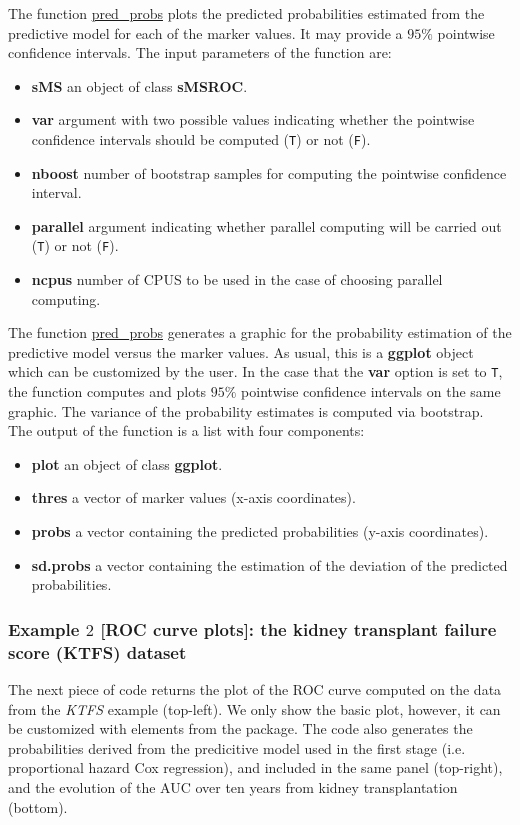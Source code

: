 The function \url{pred\_probs} plots the predicted probabilities estimated from the predictive model for each of the marker values. It may provide a $95\%$ pointwise confidence intervals. The input parameters of the function are:
\begin{itemize}
\item{\textbf{sMS}} {an object of class {\textbf{sMSROC}}.} 
\item{\textbf{var}} {argument with two possible values indicating whether the pointwise confidence intervals should be computed (\texttt{T}) or not (\texttt{F}).}
\item{\textbf{nboost}} {number of bootstrap samples for computing the pointwise confidence interval.}
\item{\textbf{parallel}} {argument indicating whether parallel computing will be carried out (\texttt{T}) or not (\texttt{F}).}
\item{\textbf{ncpus}} {number of CPUS to be used in the case of choosing parallel computing.}
\end{itemize}
The function \url{pred\_probs} generates a graphic for the probability estimation of the predictive model versus the marker values. As usual, this is a {\textbf{ggplot}} object which can be customized by the user. In the case that the {\textbf{var}} option is set to \texttt{T}, the function computes and plots $95\%$ pointwise confidence intervals on the same graphic. The variance of the probability estimates is computed via bootstrap. The output of the function is a list with four components:
\begin{itemize}
\item{\textbf{plot}} {an object of class {\textbf{ggplot}}.} 
\item{\textbf{thres}} {a vector of marker values (x-axis coordinates).}
\item{\textbf{probs}} {a vector containing the predicted probabilities (y-axis coordinates).}
\item{\textbf{sd.probs}} {a vector containing the estimation of the deviation of the predicted probabilities.}
\end{itemize}
\subsubsection{Example $2$ [ROC curve plots]: the kidney transplant failure score (KTFS) dataset}
The next piece of code returns the plot of the ROC curve computed on the data from the {\textit{KTFS}} example (top-left). We only show the basic plot, however, it can be customized with elements from the  package. The code also generates the probabilities derived from the predicitive model used in the first stage (i.e. proportional hazard Cox regression), and included in the same panel (top-right), and the evolution of the AUC over ten years from kidney transplantation (bottom).

